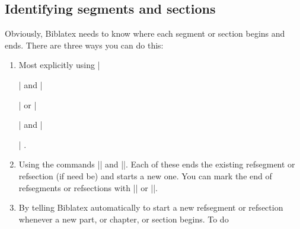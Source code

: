 \subsection{Identifying segments and sections}

Obviously, Biblatex needs to know where each segment or section begins
and ends. There are three ways you can do this:

\begin{enumerate}
\item
  \begin{marginfigure}
  \end{marginfigure}
  Most explicitly using
  |\begin{refsection}| and |\end{refsection}|
  or
  |\begin{refsegment}| and |\end{refsegment}|
.
\item
  \begin{marginfigure}
  \end{marginfigure}
  Using the commands |\newrefsection| and |\newrefsegment|. Each of these
  ends the existing refsegment or refsection (if need be) and starts a
  new one. You can mark the end of refsegments or
  refsections with |\endrefsegment| or |\endrefsection|.
\item
  By telling Biblatex automatically to start a new refsegment or
  refsection whenever a new part, or chapter, or section begins. To do

\end{enumerate}
